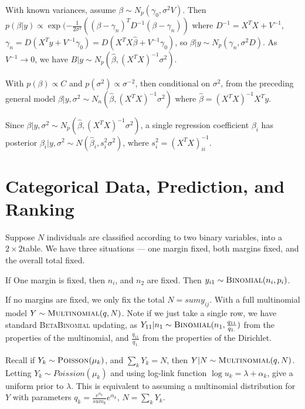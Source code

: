 With known variances, assume $\beta \sim N_{p}(\gamma_{0}, \sigma^{2}
V)$.  Then $p(\beta | y) \propto \exp(-\frac{1}{2 \sigma^{2}} ((\beta -
\gamma_{n})^{T} D^{-1} (\beta - \gamma_{n}))$ where $D^{-1} = X^{T} X
+ V^{-1}$, $\gamma_{n} = D(X^{T} y + V^{-1} \gamma_{0}) = D(X^{T} X
\hat \beta + V^{-1} \gamma_{0})$, so $\beta | y \sim N_{p}(\gamma_{n},
\sigma^{2} D)$.  As $V^{-1} \rightarrow 0$, we have $B|y \sim
N_{p}(\hat \beta, (X^{T} X)^{-1} \sigma^{2})$.

With $p(\beta) \propto C$ and $p(\sigma^{2}) \propto \sigma^{-2}$, then
conditional on $\sigma^{2}$, from the preceding general model $\beta |
y, \sigma^{2} \sim N_{n}(\hat \beta, (X^{T} X)^{-1} \sigma^{2})$ where
$\hat \beta = (X^{T} X)^{-1} X^{T} y$.

Since $\beta | y, \sigma^{2} \sim N_{p}(\hat \beta, (X^{T} X)^{-1}
\sigma^{2})$, a single regression coefficient $\beta_{i}$ has
posterior $\beta_{i} | y, \sigma^{2} \sim N(\hat \beta_{i}, s_{i}^{2}
\sigma^{2})$, where $s_{i}^{2} = (X^{T} X)^{-1}_{ii}$.


\section{Categorical Data, Prediction, and Ranking}
\label{sec:categ-data-pred}

Suppose $N$ individuals are classified according to two binary
variables, into a $2 \times 2$table.  We have three situations --- one
margin fixed, both margins fixed, and the overall total fixed.

If One
margin is fixed, then $n_{i}$, and $n_{2}$ are fixed.  Then $y_{i1}
\sim \textsc{Binomial}(n_{i}, p_{i})$.

If no margins are fixed, we only fix the total $N = sum y_{ij}$. With
a full multinomial model $Y \sim \textsc{Multinomial}(q, N)$. Note if we just
take a single row, we have standard \textsc{BetaBinomial} updating, as $Y_{11}
| n_{1} \sim \textsc{Binomial}(n_{1}, \frac{q_{11}}{q_{1.}} )$ from the
properties of the multinomial, and $\frac{q_{11}}{q_{1.}}$ from the
properties of the Dirichlet.

\begin{defn}
  \label{sec:categ-data-pred-1}
  Recall if $Y_{k} \sim \textsc{Poisson}(\mu_{k})$, and $\sum_{k}^{} Y_{k} =
  N$, then $Y|N \sim \textsc{Multinomial}(q, N)$.  Letting $Y_{k} \sim
  Poission(\mu_{k})$ and using log-link function $\log u_{k} = \lambda
  + \alpha_{k}$, give a uniform prior to $\lambda$.  This is
  equivalent to assuming a multinomial distribution for $Y$ with
  parameters $q_{k} = \frac{e^{\alpha_{k}}}{sum_{k}} e^{\alpha_{k}}$,
  $N = \sum_{k}^{} Y_{k}$.
\end{defn}

